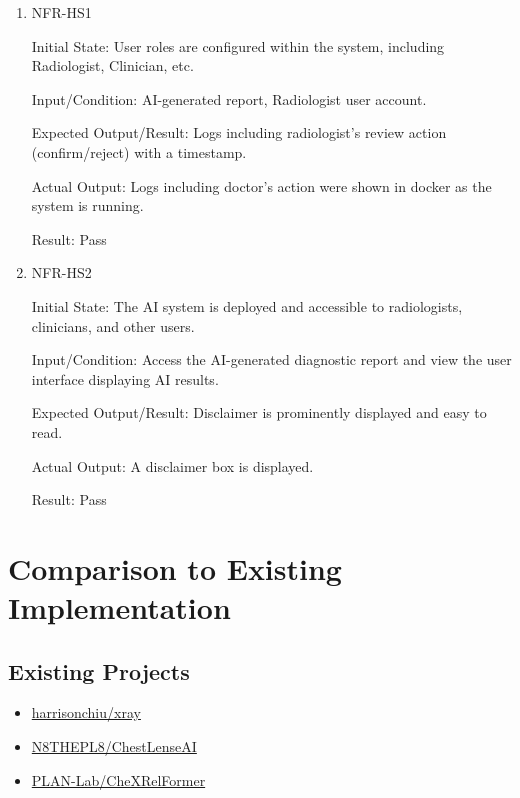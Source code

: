 \documentclass[12pt, titlepage]{article}
\begin{document}
\begin{enumerate}

  \item{NFR-HS1\\}\label{NFR-HS1}

  Initial State: User roles are configured within the system, including Radiologist, Clinician, etc.

  Input/Condition: AI-generated report, Radiologist user account.

  Expected Output/Result: Logs including radiologist’s review action (confirm/reject) with a timestamp.

  Actual Output: Logs including doctor's action were shown in docker as the system is running.

  Result: Pass

  \item{NFR-HS2\\}\label{NFR-HS2}

  Initial State: The AI system is deployed and accessible to radiologists, clinicians, and other users.

  Input/Condition: Access the AI-generated diagnostic report and view the user interface displaying AI results.

  Expected Output/Result: Disclaimer is prominently displayed and easy to read.

  Actual Output: A disclaimer box is displayed.

  Result: Pass
  \end{enumerate}

\newpage
\section{Comparison to Existing Implementation}	

\subsection{Existing Projects}
\begin{itemize}
    \item \href{https://github.com/harrisonchiu/xray/tree/main}{harrisonchiu/xray}
    \item \href{https://github.com/N8THEPL8/ChestLenseAI/tree/main}{N8THEPL8/ChestLenseAI}
    \item \href{https://github.com/PLAN-Lab/CheXRelFormer/tree/main}{PLAN-Lab/CheXRelFormer}
\end{itemize}
\end{document}
